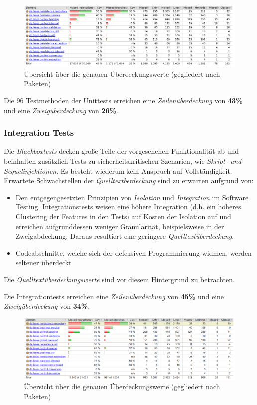 \begin{figure}[h]
    \centering
    \includegraphics[width=0.9\linewidth]{graphics/coverage_unit}
    \caption{Übersicht über die genauen Überdeckungswerte (gegliedert nach Paketen)}
    \label{fig:coverage_unit}
\end{figure}

Die 96 Testmethoden der Unittests erreichen eine \emph{Zeilenüberdeckung} von \textbf{43\%}
und eine \emph{Zweigüberdeckung} von \textbf{26\%}.


\subsubsection{Integration Tests}
Die \emph{Blackboxtests} decken große Teile der vorgesehenen Funktionalität ab und beinhalten zusätzlich Tests
zu sicherheitskritischen Szenarien, wie \emph{Skript- und Sequelinjektionen}.
Es besteht wiederum kein Anspruch auf Vollständigkeit.
Erwartete Schwachstellen der \emph{Quelltextberdeckung} sind zu erwarten aufgrund von:
\begin{itemize}
    \item Den entgegengesetzten Prinzipien von \emph{Isolation} und \emph{Integration} im Software Testing.
    Integrationstests weisen eine höhere Integration (d.h. ein höheres Clustering der Features in den Tests)
    auf Kosten der Isolation auf und erreichen aufgrunddessen weniger Granularität, beispielsweise in der Zweigabdeckung.
    Daraus resultiert eine geringere \emph{Quelltextüberdeckung}.
    \item Codeabschnitte, welche sich der defensiven Programmierung widmen, werden seltener überdeckt
\end{itemize}
Die \emph{Quelltextüberdeckungswerte} sind vor diesem Hintergrund zu betrachten.

Die Integrationtests erreichen eine \emph{Zeilenüberdeckung} von \textbf{45\%}
und eine \emph{Zweigüberdeckung} von \textbf{34\%}.

\begin{figure}[h]
    \centering
    \includegraphics[width=0.9\linewidth]{graphics/coverage_it}
    \caption{Übersicht über die genauen Überdeckungswerte (gegliedert nach Paketen)}
    \label{fig:coverag_it}
\end{figure}

